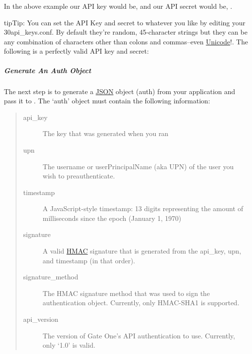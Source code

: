 \documentclass[letterpaper,10pt,openany]{sphinxmanual}
\begin{document}
In the above example our API key would be,  and our API secret would be, .

\begin{notice}{tip}{Tip:}
You can set the API Key and secret to whatever you like by editing your 30api\_keys.conf.  By default they're random, 45-character strings but they can be any combination of characters other than colons and commas--even \href{http://en.wikipedia.org/wiki/Unicode}{Unicode}!.  The following is a perfectly valid API key and secret:

\end{notice}


\subparagraph{Generate An Auth Object}
\label{Developer/embedding_api_auth:generate-an-auth-object}
The next step is to generate a \href{http://en.wikipedia.org/wiki/JSON}{JSON} object (auth) from your application and pass it to {\hyperref[Developer/js_gateone:GateOne.init]{}}.  The `auth' object must contain the following information:
\begin{quote}
\begin{description}
\item[{api\_key}] \leavevmode
The key that was generated when you ran 

\item[{upn}] \leavevmode
The username or userPrincipalName (aka UPN) of the user you wish to preauthenticate.

\item[{timestamp}] \leavevmode
A JavaScript-style timestamp:  13 digits representing the amount of milliseconds since the epoch (January 1, 1970)

\item[{signature}] \leavevmode
A valid \href{http://en.wikipedia.org/wiki/Hash-based\_message\_authentication\_code}{HMAC} signature that is generated from the api\_key, upn, and timestamp (in that order).

\item[{signature\_method}] \leavevmode
The HMAC signature method that was used to sign the authentication object.  Currently, only HMAC-SHA1 is supported.

\item[{api\_version}] \leavevmode
The version of Gate One's API authentication to use.  Currently, only `1.0' is valid.

\end{description}
\end{quote}
\end{document}

